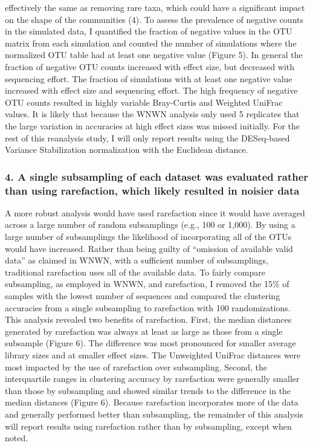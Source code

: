 \documentclass[
]{article}
\begin{document}
effectively the same as removing rare taxa, which could have a
significant impact on the shape of the communities (4). To assess the
prevalence of negative counts in the simulated data, I quantified the
fraction of negative values in the OTU matrix from each simulation and
counted the number of simulations where the normalized OTU table had at
least one negative value (Figure 5). In general the fraction of negative
OTU counts increased with effect size, but decreased with sequencing
effort. The fraction of simulations with at least one negative value
increased with effect size and sequencing effort. The high frequency of
negative OTU counts resulted in highly variable Bray-Curtis and Weighted
UniFrac values. It is likely that because the WNWN analysis only used 5
replicates that the large variation in accuracies at high effect sizes
was missed initially. For the rest of this reanalysis study, I will only
report results using the DESeq-based Variance Stabilization
normalization with the Euclidean distance.

\hypertarget{a-single-subsampling-of-each-dataset-was-evaluated-rather-than-using-rarefaction-which-likely-resulted-in-noisier-data}{%
\subsubsection{4. A single subsampling of each dataset was evaluated
rather than using rarefaction, which likely resulted in noisier
data}\label{a-single-subsampling-of-each-dataset-was-evaluated-rather-than-using-rarefaction-which-likely-resulted-in-noisier-data}}

A more robust analysis would have used rarefaction since it would have
averaged across a large number of random subsamplings (e.g., 100 or
1,000). By using a large number of subsamplings the likelihood of
incorporating all of the OTUs would have increased. Rather than being
guilty of ``omission of available valid data'' as claimed in WNWN, with
a sufficient number of subsamplings, traditional rarefaction uses all of
the available data. To fairly compare subsampling, as employed in WNWN,
and rarefaction, I removed the 15\% of samples with the lowest number of
sequences and compared the clustering accuracies from a single
subsampling to rarefaction with 100 randomizations. This analysis
revealed two benefits of rarefaction. First, the median distances
generated by rarefaction was always at least as large as those from a
single subsample (Figure 6). The difference was most pronounced for
smaller average library sizes and at smaller effect sizes. The
Unweighted UniFrac distances were most impacted by the use of
rarefaction over subsampling. Second, the interquartile ranges in
clustering accuracy by rarefaction were generally smaller than those by
subsampling and showed similar trends to the difference in the median
distances (Figure 6). Because rarefaction incorporates more of the data
and generally performed better than subsampling, the remainder of this
analysis will report results using rarefaction rather than by
subsampling, except when noted.
\end{document}
